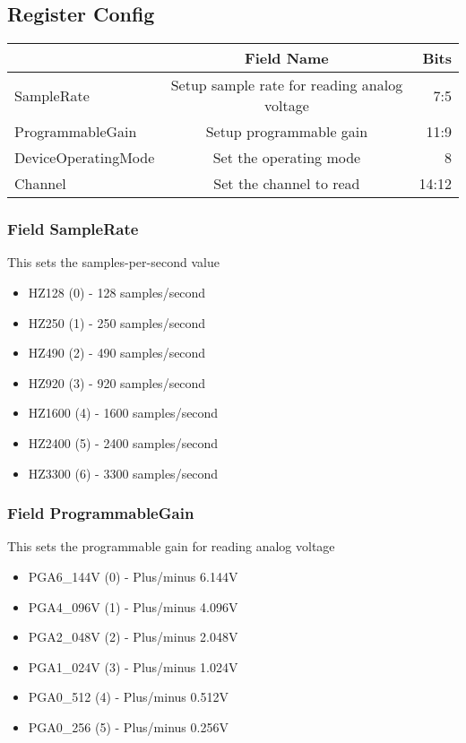 \documentclass[a4paper,12pt,oneside,pdflatex,italian,final,twocolumn]{article}
\begin{document}
\raggedright

\subsection{Register Config}
\centering
\begin{tabular}{lcr}
\toprule
  & Field Name & Bits \\
\midrule
SampleRate & Setup sample rate for reading analog voltage & 
7:5
\\
ProgrammableGain & Setup programmable gain & 
11:9
\\
DeviceOperatingMode & Set the operating mode & 
8
\\
Channel & Set the channel to read & 
14:12
\\
\bottomrule

\end{tabular}


\raggedright

\subsubsection{Field SampleRate }

This sets the samples-per-second value


\begin{itemize}
\item HZ128 (0) - 128 samples/second
\item HZ250 (1) - 250 samples/second
\item HZ490 (2) - 490 samples/second
\item HZ920 (3) - 920 samples/second
\item HZ1600 (4) - 1600 samples/second
\item HZ2400 (5) - 2400 samples/second
\item HZ3300 (6) - 3300 samples/second
\end{itemize}


\raggedright

\subsubsection{Field ProgrammableGain }

This sets the programmable gain for reading analog voltage


\begin{itemize}
\item PGA6\_144V (0) - Plus/minus 6.144V
\item PGA4\_096V (1) - Plus/minus 4.096V
\item PGA2\_048V (2) - Plus/minus 2.048V
\item PGA1\_024V (3) - Plus/minus 1.024V
\item PGA0\_512 (4) - Plus/minus 0.512V
\item PGA0\_256 (5) - Plus/minus 0.256V
\end{itemize}
\end{document}
